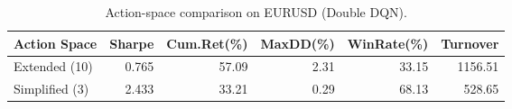 \begin{table}[!tbp]
\centering
\caption{Action-space comparison on EURUSD (Double DQN).}
\label{tab:action_space}
\begin{adjustbox}{width=\linewidth}
\begin{tabular}{@{}lrrrrr@{}}
\toprule
\textbf{Action Space} & \textbf{Sharpe} & \textbf{Cum.Ret(\%)} & \textbf{MaxDD(\%)} & \textbf{WinRate(\%)} & \textbf{Turnover} \\
\midrule
Extended (10) & 0.765 & 57.09 & 2.31 & 33.15 & 1156.51 \\
Simplified (3) & 2.433 & 33.21 & 0.29 & 68.13 & 528.65  \\
\bottomrule
\end{tabular}
\end{adjustbox}
\end{table}


